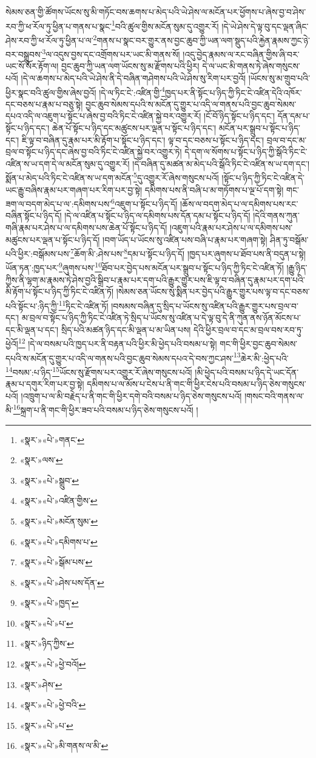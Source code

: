 སེམས་ཅན་གྱི་ཚོགས་ཡོངས་སུ་མི་གཏོང་བས་ཆགས་པ་མེད་པའི་ཡེ་ཤེས་ལ་མངོན་པར་ཕྱོགས་པ་ཞེས་བྱ་བ་ཤེས་རབ་ཀྱི་ཕ་རོལ་ཏུ་ཕྱིན་པ་གནས་པ་སྣང་\footnote{«སྣར་»«པེ་»གནང་}བའི་ཚུལ་གྱིས་མངོན་སུམ་དུ་འགྱུར་རོ། །དེ་ཡེ་ཤེས་དེ་ལྟ་བུ་དང་ལྡན་ཞིང་ཤེས་རབ་ཀྱི་ཕ་རོལ་ཏུ་ཕྱིན་པ་ལ་\footnote{«སྣར་»ལས་}གནས་པ་སྣང་བར་གྱུར་ནས་བྱང་ཆུབ་ཀྱི་ཡན་ལག་སྡུད་པའི་རྐྱེན་རྣམས་ཀྱང་ཉེ་བར་བསྒྲུབས་\footnote{«སྣར་»«པེ་»སྒྲུབ་}ལ་འདུས་བྱས་དང་འགྲོགས་པར་ཡང་མི་གནས་སོ། །འདུ་བྱེད་རྣམས་ལ་རང་བཞིན་གྱིས་ཞི་བར་ཡང་སོ་སོར་རྟོག་ལ། བྱང་ཆུབ་ཀྱི་ཡན་ལག་ཡོངས་སུ་མ་རྫོགས་པའི་ཕྱིར། དེ་ལ་ཡང་མི་གནས་ཏེ་ཞེས་གསུངས་པའོ། །དེ་ལ་ཆགས་པ་མེད་པའི་ཡེ་ཤེས་ནི་དེ་བཞིན་གཤེགས་པའི་ཡེ་ཤེས་སུ་རིག་པར་བྱའོ། །ཡོངས་སུ་མ་གྲུབ་པའི་ཕྱིར་སྣང་བའི་ཚུལ་གྱིས་ཞེས་བྱའོ། །དེ་ལ་ཏིང་ངེ་:འཛིན་གྱི་\footnote{«སྣར་»«པེ་»འཛིན་གྱིས་}ཁྱད་པར་ནི་སྟོང་པ་ཉིད་ཀྱི་ཏིང་ངེ་འཛིན་དེའི་འཁོར་དང་བཅས་པ་རྣམ་པ་བཅུ་སྟེ། བྱང་ཆུབ་སེམས་དཔའི་ས་མངོན་དུ་གྱུར་པ་འདི་ལ་གནས་པའི་བྱང་ཆུབ་སེམས་དཔའ་འདི་ལ་འཇུག་པ་སྟོང་པ་ཞེས་བྱ་བའི་ཏིང་ངེ་འཛིན་སྐྱེ་བར་འགྱུར་རོ། །ངོ་བོ་ཉིད་སྟོང་པ་ཉིད་དང་། དོན་དམ་པ་སྟོང་པ་ཉིད་དང་། ཆེན་པོ་སྟོང་པ་ཉིད་དང་མཚུངས་པར་ལྡན་པ་སྟོང་པ་ཉིད་དང་། མངོན་པར་སྒྲུབ་པ་སྟོང་པ་ཉིད་དང་། ཇི་ལྟ་བ་བཞིན་དུ་རྣམ་པར་མི་རྟོག་པ་སྟོང་པ་ཉིད་དང་། ལྟ་བ་དང་བཅས་པ་སྟོང་པ་ཉིད་དང་། བྲལ་བ་དང་མ་བྲལ་བ་སྟོང་པ་ཉིད་དང་ཞེས་བྱ་བའི་ཏིང་ངེ་འཛིན་སྐྱེ་བར་འགྱུར་ཏེ། དེ་དག་ལ་སོགས་པ་སྟོང་པ་ཉིད་ཀྱི་སྒོའི་ཏིང་ངེ་འཛིན་ས་ཡ་དག་དེ་ལ་མངོན་སུམ་དུ་འགྱུར་རོ། །དེ་བཞིན་དུ་མཚན་མ་མེད་པའི་སྒོའི་ཏིང་ངེ་འཛིན་ས་ཡ་དག་དང་། སྨོན་པ་མེད་པའི་ཏིང་ངེ་འཛིན་ས་ཡ་དག་མངོན་\footnote{«སྣར་»«པེ་»མངོན་སུམ་}དུ་འགྱུར་རོ་ཞེས་གསུངས་པའོ། །སྟོང་པ་ཉིད་ཀྱི་ཏིང་ངེ་འཛིན་དེ་ཡང་རྒྱུ་བཞིས་རྣམ་པར་གཞག་པར་རིག་པར་བྱ་སྟེ། དམིགས་པས་ནི་བཞི་པ་མ་གཏོགས་པ་ལྔ་པོ་དག་སྟེ། གང་ཟག་ལ་བདག་མེད་པ་ལ་:དམིགས་པས་\footnote{«སྣར་»«པེ་»དམིགས་པ་}འཇུག་པ་སྟོང་པ་ཉིད་དོ། །ཆོས་ལ་བདག་མེད་པ་ལ་དམིགས་པས་རང་བཞིན་སྟོང་པ་ཉིད་དོ། །དེ་ལ་འཛིན་པ་སྟོང་པ་ཉིད་ལ་དམིགས་པས་དོན་དམ་པ་སྟོང་པ་ཉིད་དོ། །དེའི་གནས་ཀུན་གཞི་རྣམ་པར་ཤེས་པ་ལ་དམིགས་པས་ཆེན་པོ་སྟོང་པ་ཉིད་དོ། །འཇུག་པའི་རྣམ་པར་ཤེས་པ་ལ་དམིགས་པས་མཚུངས་པར་ལྡན་པ་སྟོང་པ་ཉིད་དོ། །བག་ཡོད་པ་ཡོངས་སུ་འཛིན་པས་བཞི་པ་རྣམ་པར་གཞག་སྟེ། ཤིན་ཏུ་བསྒོམ་པའི་ཕྱིར་:བསྒོམས་པས་\footnote{«སྣར་»«པེ་»སྒོམ་པས་}ཆོག་མི་:ཤེས་པས་\footnote{«སྣར་»«པེ་»ཤེས་པས་དོན་}དམ་པ་སྟོང་པ་ཉིད་དོ། །ཁྱད་པར་ཞུགས་པ་ཐོབ་པས་ནི་བདུན་པ་སྟེ། ཡོན་ཏན་:ཁྱད་པར་\footnote{«སྣར་»«པེ་»ཁྱད་}ཞུགས་པས་\footnote{«སྣར་»«པེ་»པ་}ཐོབ་པར་བྱེད་པས་མངོན་པར་སྒྲུབ་པ་སྟོང་པ་ཉིད་ཀྱི་ཏིང་ངེ་འཛིན་ཏོ། །རྒྱུ་ཉིད་ཀྱིས་ནི་ལྷག་མ་རྣམས་ཏེ་ཤེས་བྱའི་སྒྲིབ་པ་རྣམ་པར་དག་པའི་རྒྱུར་གྱུར་པས་ཇི་ལྟ་བ་བཞིན་དུ་རྣམ་པར་དག་པའི་མི་རྟོག་པ་སྟོང་པ་ཉིད་ཀྱི་ཏིང་ངེ་འཛིན་ཏོ། །སེམས་ཅན་ཡོངས་སུ་སྨིན་པར་བྱེད་པའི་རྒྱུར་གྱུར་པས་ལྟ་བ་དང་བཅས་པའི་སྟོང་པ་:ཉིད་ཀྱི་\footnote{«སྣར་»ཉིད་ཀྱིས་}ཏིང་ངེ་འཛིན་ཏོ། །བསམས་བཞིན་དུ་སྲིད་པ་ཡོངས་སུ་འཛིན་པའི་རྒྱུར་གྱུར་པས་བྲལ་བ་དང་། མ་བྲལ་བ་སྟོང་པ་ཉིད་ཀྱི་ཏིང་ངེ་འཛིན་ཏེ་སྲིད་པ་ཡོངས་སུ་འཛིན་པ་དེ་ལྟ་བུ་དེ་ནི་ཀུན་ནས་ཉོན་མོངས་པ་དང་མི་ལྡན་པ་དང་། སྲིད་པའི་མཚན་ཉིད་དང་མི་ལྡན་པ་མ་ཡིན་པས། དེའི་ཕྱིར་བྲལ་བ་དང་མ་བྲལ་བས་རབ་ཏུ་ཕྱེའོ།\footnote{«སྣར་»«པེ་»ཕྱེ་བའོ།} །དེ་ལ་བསམ་པའི་ཁྱད་པར་ནི་བརྟན་པའི་ཕྱིར་མི་ཕྱེད་པའི་བསམ་པ་སྟེ། གང་གི་ཕྱིར་བྱང་ཆུབ་སེམས་དཔའི་ས་མངོན་དུ་གྱུར་པ་འདི་ལ་གནས་པའི་བྱང་ཆུབ་སེམས་དཔའ་དེ་བས་ཀྱང་ཤས་\footnote{«སྣར་»ཤེས་}ཆེར་མི་:ཕྱེད་པའི་\footnote{«སྣར་»«པེ་»ཕྱེ་བའི་}བསམ་:པ་ཉིད་\footnote{«སྣར་»«པེ་»པ་}ཡོངས་སུ་རྫོགས་པར་འགྱུར་རོ་ཞེས་གསུངས་པའོ། །མི་ཕྱེད་པའི་བསམ་པ་ཉིད་དེ་ཡང་དོན་རྣམ་པ་དགུར་རིག་པར་བྱ་སྟེ། དམིགས་པ་ལ་མོས་པ་ངེས་པ་ནི་གང་གི་ཕྱིར་ངེས་པའི་བསམ་པ་ཉིད་ཅེས་གསུངས་པའོ། །འཁྲུག་པ་ལ་མི་བརྗེད་པ་ནི་གང་གི་ཕྱིར་དགེ་བའི་བསམ་པ་ཉིད་ཅེས་གསུངས་པའོ། །གསང་བའི་གནས་ལ་མི་\footnote{«སྣར་»«པེ་»མི་གནས་ལ་མི་}སྐྲག་པ་ནི་གང་གི་ཕྱིར་ཟབ་པའི་བསམ་པ་ཉིད་ཅེས་གསུངས་པའོ། །
